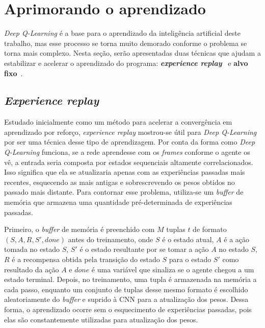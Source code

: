 
\section{Aprimorando o aprendizado}
\label{sec:enhance}

\textit{Deep Q-Learning} é a base para o aprendizado da inteligência artificial deste trabalho, mas esse processo se torna muito demorado conforme o problema se torna mais complexo.
Nesta seção, serão apresentadas duas técnicas que ajudam a estabilizar e acelerar o aprendizado do programa:
\textit{\textbf{experience replay}}~\cite{Lin1992} e \textbf{alvo fixo}~\cite{humanLevelControlDRL}.


\subsection{\textit{Experience replay}}
\label{sec:er}

Estudado inicialmente como um método para acelerar a convergência em aprendizado por reforço, \textit{experience replay} mostrou-se útil para \textit{Deep Q-Learning} por ser uma técnica desse tipo de aprendizagem.
Por conta da forma como \textit{Deep Q-Learning} funciona, se a rede aprendesse com os \textit{frames} conforme o agente os vê, a entrada seria composta por estados sequenciais altamente correlacionados.
Isso significa que ela se atualizaria apenas com as experiências passadas mais recentes, esquecendo as mais antigas e sobrescrevendo os pesos obtidos no passado mais distante.
Para contornar esse problema, utiliza-se um \textit{buffer} de memória que armazena uma quantidade pré-determinada de experiências passadas.

Primeiro, o \textit{buffer} de memória é preenchido com $M$ tuplas $t$ de formato $(S, A, R, S', done)$ antes do treinamento, onde $S$ é o estado atual, $A$ é a ação tomada no estado $S$, $S'$ é o estado resultante por se tomar a ação $A$ no estado $S$, $R$ é a recompensa obtida pela transição do estado $S$ para o estado $S'$ como resultado da ação $A$ e $done$ é uma variável que sinaliza se o agente chegou a um estado terminal.
Depois, no treinamento, uma tupla é armazenada na memória a cada passo, enquanto um conjunto de tuplas desse mesmo formato é escolhido aleatoriamente do \textit{buffer} e suprido à CNN para a atualização dos pesos.
Dessa forma, o aprendizado ocorre sem o esquecimento de experiências passadas, pois elas são constantemente utilizadas para atualização dos pesos.

